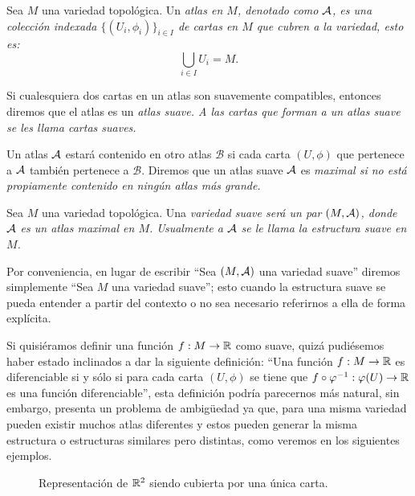 \begin{definition}\label{Definición: Atlas}
	Sea $M$ una variedad topológica. Un \it{atlas} en $M$, denotado como $\mathcal{A}$, es una colección indexada $\{(U_i,\phi_i)\}_{i\in I}$ de cartas en $M$ que cubren a la variedad, esto es:
	\[\bigcup_{i \in I} U_i = M. \]

	Si cualesquiera dos cartas en un atlas son suavemente compatibles, entonces diremos que el atlas es un \it{atlas suave}. A las cartas que forman a un atlas suave se les llama \it{cartas suaves}.

	Un atlas $\mathcal{A}$ estará contenido en otro atlas $\mathcal{B}$ si cada carta $(U,\phi)$ que pertenece a $\mathcal{A}$ también pertenece a $\mathcal{B}$. Diremos que un atlas suave $\mathcal{A}$ es \it{maximal} si no está propiamente contenido en ningún atlas más grande.
\end{definition}

\begin{definition}\label{Definición: Variedad Suave}
	Sea $M$ una variedad topológica. Una \it{variedad suave} será un par $(M, \mathcal{A})$, donde $\mathcal{A}$ es un atlas maximal en $M$. Usualmente a $\mathcal{A}$ se le llama la \it{estructura suave} en $M$.
\end{definition}

Por conveniencia, en lugar de escribir \enquote{Sea $(M,\mathcal{A})$ una variedad suave} diremos simplemente \enquote{Sea $M$ una variedad suave}; esto cuando la estructura suave se pueda entender a partir del contexto o no sea necesario referirnos a ella de forma explícita.


Si quisiéramos definir una función $f: M \to \mathbb{R}$ como suave, quizá pudiésemos haber estado inclinados a dar la siguiente definición: \enquote{Una función $f: M \to \mathbb{R}$ es diferenciable si y sólo si para cada carta $(U,\phi)$ se tiene que $f\circ \varphi^{-1}: \varphi(U) \to \mathbb{R}$ es una función diferenciable}, esta definición podría parecernos más natural, sin embargo, presenta un problema de ambigüedad ya que, para una misma variedad pueden existir muchos atlas diferentes y estos pueden generar la misma estructura o estructuras similares pero distintas, como veremos en los siguientes ejemplos.
\begin{figure}[h]
	\begin{center}
		
		\caption{Representación de $\mathbb{R}^2$ siendo cubierta por una única carta.}
	\end{center}
\end{figure}

